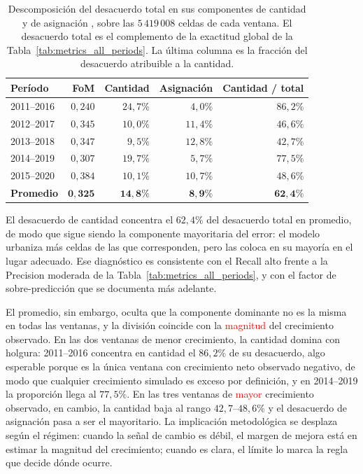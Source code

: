 \begin{table}[htbp]
\centering
\caption{Descomposición del desacuerdo total en sus componentes de cantidad y de asignación \parencite{PontiusMillones2011}, sobre las $5\,419\,008$ celdas de cada ventana. El desacuerdo total es el complemento de la exactitud global de la Tabla~\ref{tab:metrics_all_periods}. La última columna es la fracción del desacuerdo atribuible a la cantidad.}
\label{tab:pontius_decomposition}
\begin{tabular}{lrrrr}
\toprule
\textbf{Período} & \textbf{FoM} & \textbf{Cantidad} & \textbf{Asignación} & \textbf{Cantidad / total} \\
\midrule
2011--2016 & $0{,}240$ & $24{,}7\%$ & $4{,}0\%$  & $86{,}2\%$ \\
2012--2017 & $0{,}345$ & $10{,}0\%$ & $11{,}4\%$ & $46{,}6\%$ \\
2013--2018 & $0{,}347$ & $9{,}5\%$  & $12{,}8\%$ & $42{,}7\%$ \\
2014--2019 & $0{,}307$ & $19{,}7\%$ & $5{,}7\%$  & $77{,}5\%$ \\
2015--2020 & $0{,}384$ & $10{,}1\%$ & $10{,}7\%$ & $48{,}6\%$ \\
\midrule
\textbf{Promedio} & $\mathbf{0{,}325}$ & $\mathbf{14{,}8\%}$ & $\mathbf{8{,}9\%}$ & $\mathbf{62{,}4\%}$ \\
\bottomrule
\end{tabular}
\end{table}

El desacuerdo de cantidad concentra el $62{,}4\%$ del desacuerdo total en promedio, de modo que sigue siendo la componente mayoritaria del error: el modelo urbaniza más celdas de las que corresponden, pero las coloca en su mayoría en el lugar adecuado. Ese diagnóstico es consistente con el Recall alto frente a la Precision moderada de la Tabla~\ref{tab:metrics_all_periods}, y con el factor de sobre-predicción que se documenta más adelante.

El promedio, sin embargo, oculta que la componente dominante no es la misma en todas las ventanas, y la división coincide con la \textcolor{red}{magnitud} del crecimiento observado. En las dos ventanas de menor crecimiento, la cantidad domina con holgura: 2011--2016 concentra en cantidad el $86{,}2\%$ de su desacuerdo, algo esperable porque es la única ventana con crecimiento neto observado negativo, de modo que cualquier crecimiento simulado es exceso por definición, y en 2014--2019 la proporción llega al $77{,}5\%$. En las tres ventanas de \textcolor{red}{mayor} crecimiento observado, en cambio, la cantidad baja al rango $42{,}7$--$48{,}6\%$ y el desacuerdo de asignación pasa a ser el mayoritario. La implicación metodológica se desplaza según el régimen: cuando la señal de cambio es débil, el margen de mejora está en estimar la magnitud del crecimiento; cuando es clara, el límite lo marca la regla que decide dónde ocurre.

